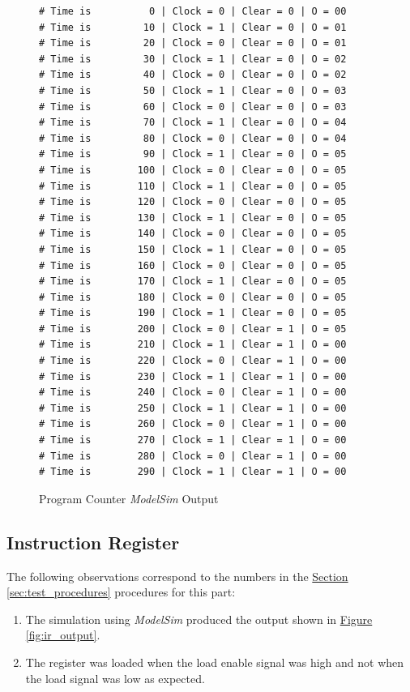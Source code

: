 \begin{figure}[htbp]
    \begin{lstlisting}[numbers=none, basicstyle = \ttfamily\scriptsize]
# Time is          0 | Clock = 0 | Clear = 0 | O = 00
# Time is         10 | Clock = 1 | Clear = 0 | O = 01
# Time is         20 | Clock = 0 | Clear = 0 | O = 01
# Time is         30 | Clock = 1 | Clear = 0 | O = 02
# Time is         40 | Clock = 0 | Clear = 0 | O = 02
# Time is         50 | Clock = 1 | Clear = 0 | O = 03
# Time is         60 | Clock = 0 | Clear = 0 | O = 03
# Time is         70 | Clock = 1 | Clear = 0 | O = 04
# Time is         80 | Clock = 0 | Clear = 0 | O = 04
# Time is         90 | Clock = 1 | Clear = 0 | O = 05
# Time is        100 | Clock = 0 | Clear = 0 | O = 05
# Time is        110 | Clock = 1 | Clear = 0 | O = 05
# Time is        120 | Clock = 0 | Clear = 0 | O = 05
# Time is        130 | Clock = 1 | Clear = 0 | O = 05
# Time is        140 | Clock = 0 | Clear = 0 | O = 05
# Time is        150 | Clock = 1 | Clear = 0 | O = 05
# Time is        160 | Clock = 0 | Clear = 0 | O = 05
# Time is        170 | Clock = 1 | Clear = 0 | O = 05
# Time is        180 | Clock = 0 | Clear = 0 | O = 05
# Time is        190 | Clock = 1 | Clear = 0 | O = 05
# Time is        200 | Clock = 0 | Clear = 1 | O = 05
# Time is        210 | Clock = 1 | Clear = 1 | O = 00
# Time is        220 | Clock = 0 | Clear = 1 | O = 00
# Time is        230 | Clock = 1 | Clear = 1 | O = 00
# Time is        240 | Clock = 0 | Clear = 1 | O = 00
# Time is        250 | Clock = 1 | Clear = 1 | O = 00
# Time is        260 | Clock = 0 | Clear = 1 | O = 00
# Time is        270 | Clock = 1 | Clear = 1 | O = 00
# Time is        280 | Clock = 0 | Clear = 1 | O = 00
# Time is        290 | Clock = 1 | Clear = 1 | O = 00
    \end{lstlisting}
    \caption{Program Counter \emph{ModelSim} Output\label{fig:pc_output}}
\end{figure}


\subsection{Instruction Register} %
\label{sub:instruction_register}

The following observations correspond to the numbers in the \hyperref[sec:test_procedures]{Section \ref*{sec:test_procedures}} procedures for this part:

\begin{enumerate}
    \item The simulation using \emph{ModelSim} produced the output shown in \hyperref[fig:ir_output]{Figure \ref*{fig:ir_output}}.
    \item The register was loaded when the load enable signal was high and not when the load signal was low as expected.
\end{enumerate}

